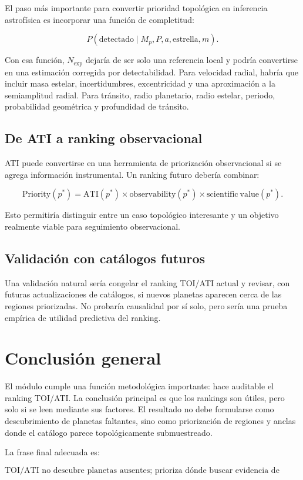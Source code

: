 \documentclass[11pt]{article}
\begin{document}
El paso más importante para convertir prioridad topológica en inferencia astrofísica es incorporar una función de completitud:

\[
P(\mathrm{detectado}\mid M_p,P,a,\mathrm{estrella},m).
\]

Con esa función, $N_{\mathrm{exp}}$ dejaría de ser solo una referencia local y podría convertirse en una estimación corregida por detectabilidad. Para velocidad radial, habría que incluir masa estelar, incertidumbres, excentricidad y una aproximación a la semiamplitud radial. Para tránsito, radio planetario, radio estelar, periodo, probabilidad geométrica y profundidad de tránsito.

\subsection{De ATI a ranking observacional}

ATI puede convertirse en una herramienta de priorización observacional si se agrega información instrumental. Un ranking futuro debería combinar:

\[
\mathrm{Priority}(p^*)=\mathrm{ATI}(p^*)\times \mathrm{observability}(p^*)\times \mathrm{scientific\ value}(p^*).
\]

Esto permitiría distinguir entre un caso topológico interesante y un objetivo realmente viable para seguimiento observacional.

\subsection{Validación con catálogos futuros}

Una validación natural sería congelar el ranking TOI/ATI actual y revisar, con futuras actualizaciones de catálogos, si nuevos planetas aparecen cerca de las regiones priorizadas. No probaría causalidad por sí solo, pero sería una prueba empírica de utilidad predictiva del ranking.

\section{Conclusión general}

El módulo cumple una función metodológica importante: hace auditable el ranking TOI/ATI. La conclusión principal es que los rankings son útiles, pero solo si se leen mediante sus factores. El resultado no debe formularse como descubrimiento de planetas faltantes, sino como priorización de regiones y anclas donde el catálogo parece topológicamente submuestreado.

La frase final adecuada es:

\[
\boxed{\text{TOI/ATI no descubre planetas ausentes; prioriza dónde buscar evidencia de incompletitud observacional.}}
\]
\end{document}
